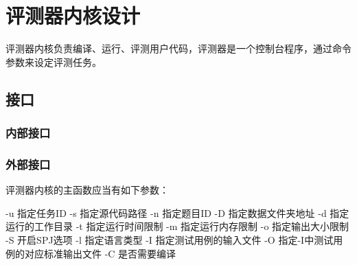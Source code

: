 
\chapter{评测器内核设计}
评测器内核负责编译、运行、评测用户代码，评测器是一个控制台程序，通过命令参数来设定评测任务。
\section{接口}
\subsection{内部接口}

\subsection{外部接口}
评测器内核的主函数应当有如下参数：

-u
	指定任务ID
-s
	指定源代码路径
-n
	指定题目ID
-D
	指定数据文件夹地址
-d
	指定运行的工作目录
-t
	指定运行时间限制
-m
	指定运行内存限制
-o
	指定输出大小限制
-S
	开启SPJ选项
-l
	指定语言类型
-I
	指定测试用例的输入文件
-O
	指定-I中测试用例的对应标准输出文件
-C
	是否需要编译